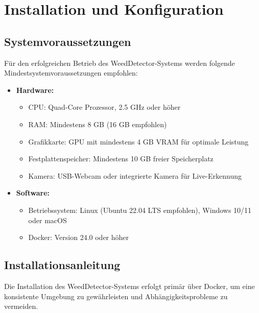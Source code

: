 \documentclass[12pt, a4paper]{scrreprt}
\begin{document}
\chapter{Installation und Konfiguration}

\section{Systemvoraussetzungen}
Für den erfolgreichen Betrieb des WeedDetector-Systems werden folgende Mindestsystemvoraussetzungen empfohlen:

\begin{itemize}
    \item \textbf{Hardware:}
    \begin{itemize}
        \item CPU: Quad-Core Prozessor, 2.5 GHz oder höher
        \item RAM: Mindestens 8 GB (16 GB empfohlen)
        \item Grafikkarte: GPU mit mindestens 4 GB VRAM für optimale Leistung
        \item Festplattenspeicher: Mindestens 10 GB freier Speicherplatz
        \item Kamera: USB-Webcam oder integrierte Kamera für Live-Erkennung
    \end{itemize}
    \item \textbf{Software:}
    \begin{itemize}
        \item Betriebssystem: Linux (Ubuntu 22.04 LTS empfohlen), Windows 10/11 oder macOS
        \item Docker: Version 24.0 oder höher
    \end{itemize}
\end{itemize}

\section{Installationsanleitung}
Die Installation des WeedDetector-Systems erfolgt primär über Docker, um eine konsistente Umgebung zu gewährleisten und Abhängigkeitsprobleme zu vermeiden.
\end{document}
